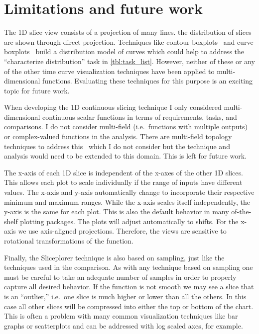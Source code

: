 \section{Limitations and future work}

The 1D slice view consists of a projection of many lines.  the distribution of
slices are shown through direct projection. Techniques like contour
boxplots~\cite{Whitaker:2013} and curve boxplots~\cite{Mirzargar:2014} build a
distribution model of curves which could help to address the ``characterize
distribution'' task in \autoref{tbl:task_list}. However, neither of these or
any of the other time curve visualization techniques have been applied to
multi-dimensional functions. Evaluating these techniques for this purpose is an
exciting topic for future work.

When developing the 1D continuous slicing technique I only considered
multi-dimensional continuous scalar functions in terms of requirements, 
tasks, and comparisons. I do not consider multi-field 
(i.e.\ functions with multiple outputs) or complex-valued functions in the
analysis. There are multi-field topology techniques to address 
this~\cite{Duke:2012,Huettenberger:2014,Carr:2015} which I do not consider
but the technique and analysis would need to be extended to this domain.
This is left for future work.

The x-axis of each 1D slice is independent of the x-axes of the other 1D
slices. This allows each plot to scale individually if the range of inputs have
different values.  The x-axis and y-axis automatically change to incorporate
their respective minimum and maximum ranges. While the x-axis scales itself
independently, the y-axis is the same for each plot.  This is also the default
behavior in many of-the-shelf plotting packages. The plots will adjust
automatically to shifts.  For the x-axis we use axis-aligned projections.
Therefore, the views are sensitive to rotational transformations of the
function. 

Finally, the Sliceplorer technique is also based on sampling, just like the 
techniques used in the comparison.
As with any technique based on sampling one
must be careful to take an adequate number of samples in order to properly
capture all desired behavior.
If the function is not smooth we may see a slice that is an ``outlier,'' i.e.\
one slice is much higher or lower than all the others. In this case all other
slices will be compressed into either the top or bottom of the chart. This is
often a problem with many common visualization techniques like bar graphs or
scatterplots and can be addressed with log scaled axes, for example.

